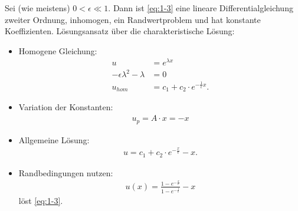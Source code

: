 \begin{enumerate}
\begin{subequations}
  \end{subequations}
Sei (wie meistens) $0< \epsilon \ll 1$. Dann ist \eqref{eq:1-3} eine lineare Differentialgleichung zweiter Ordnung, inhomogen, ein Randwertproblem und hat konstante Koeffizienten. Lösungsansatz über die charakteristische Lösung:
\begin{itemize}
\item Homogene Gleichung:
  \begin{align*}
    u &= e^{\lambda x}\\
    - \epsilon \lambda^{2} - \lambda &= 0\\
u_{hom} &= c_{1} + c_{2} \cdot e^{- \frac 1 \epsilon x}.  
  \end{align*}
\item Variation der Konstanten:
  \begin{align*}
    u_{p} = A\cdot x = - x
  \end{align*}
\item Allgemeine Lösung:
  \begin{align*}
    u = c_{1} + c_{2} \cdot e^{- \frac x \epsilon} - x. 
  \end{align*}
\item Randbedingungen nutzen:
  \begin{align*}
    u(x) = \frac{1 - e^{- \frac x \epsilon}}{1 - e^{- \frac 1 \epsilon}} - x
  \end{align*}
löst \eqref{eq:1-3}. 


\end{itemize}
\end{enumerate}
